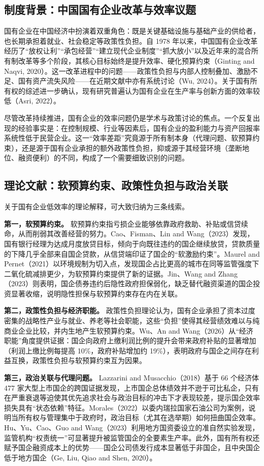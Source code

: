 \documentclass[11pt,a4paper]{ctexart}
\begin{document}
\subsection{制度背景：中国国有企业改革与效率议题}

国有企业在中国经济中扮演着双重角色：既是关键基础设施与基础产业的供给者，也长期承担着就业、社会稳定等政策性负担。自 1978 年以来，中国国有企业改革经历了“放权让利”“承包经营”“建立现代企业制度”“抓大放小”以及近年来的混合所有制改革等多个阶段，其核心目标始终是提升效率、硬化预算约束（Ginting and Naqvi, 2020）。这一改革进程中的问题——政策性负担与内部人控制叠加、激励不足、国有资产流失风险——在近期文献中亦有系统讨论（Wu, 2024）。关于国有所有权的综述进一步确认，现有研究普遍认为国有企业在生产率与创新方面的效率较低（Asri, 2022）。

尽管改革持续推进，国有企业的效率问题仍是学术与政策讨论的焦点。一个反复出现的经验事实是：在控制规模、行业等因素后，国有企业的盈利能力与资产回报率系统性低于民营企业。这一“效率差距”究竟源于所有制本身（代理问题、软预算约束），还是源于国有企业承担的额外政策性负担，抑或源于其经营环境（垄断地位、融资便利）的不同，构成了一个需要细致识别的问题。

\subsection{理论文献：软预算约束、政策性负担与政治关联}

关于国有企业低效率的理论解释，可大致归纳为三条线索。

\textbf{第一，软预算约束。} 软预算约束指亏损企业能够依靠政府救助、补贴或信贷续命，从而削弱其改善经营的努力。Cao、Fisman、Lin and Wang（2023）发现，国有银行经理为达成月度放贷目标，倾向于向既往违约的国企继续放贷，贷款质量的下降几乎全部来自国企贷款，从信贷端印证了国企的“软激励约束”。Maurel and Pernet（2021）以环境规制为切入点，发现国企占比更高的城市在同等监管强度下二氧化硫减排更少，为软预算约束提供了新的证据。Jin、Wang and Zhang（2023）则表明，国企债券违约后隐性政府担保弱化，缺乏替代融资渠道的国企投资显著收缩，说明隐性担保与软预算约束存在内在关联。

\textbf{第二，政策性负担与经济职能。} 政策性负担理论认为，国有企业承担了资本过度密集的战略性产业与就业、养老等社会职能，这些“负担”使得其经营绩效难以与纯商业企业比较，并内生地产生软预算约束。Wu、An and Wang（2026）从“经济职能”角度提供证据：国企向政府上缴利润比例的提升会带来政府补贴的显著增加（利润上缴比例每提高 10\%，政府补贴增加约 19\%），表明政府与国企之间存在利益互换，政策性负担与软预算约束互为因果。

\textbf{第三，政治关联与代理问题。} Lazzarini and Musacchio（2018）基于 66 个经济体 477 家大型上市国企的跨国证据发现，上市国企总体绩效并不逊于可比私企，只有在严重衰退等迫使其优先追求社会与政治目标的冲击下才表现较差，提示国企效率损失具有“状态依赖”特征。Morales（2022）以委内瑞拉国家石油公司为案例，说明当所有权与管理集中于政府时，政治目标（尤其在选举期）如何扭曲国企效率。Hu、Yu、Cao、Guo and Wang（2023）利用地方国资委设立的准自然实验发现，监管机构“权责统一”可显著提升被监管国企的全要素生产率。此外，国有所有权还赋予国企融资成本上的优势——国企公司债发行成本显著低于非国企，且中央国企低于地方国企（Ge, Liu, Qiao and Shen, 2020）。
\end{document}
